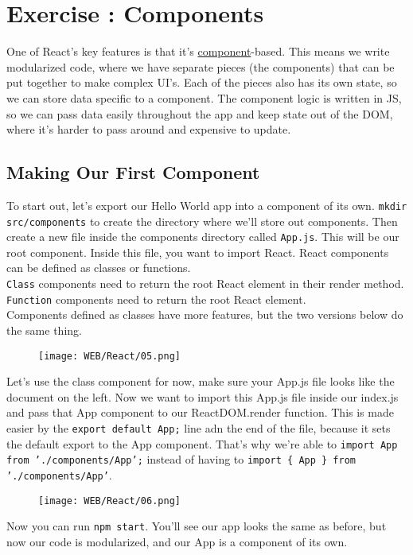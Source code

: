 \documentclass{42-en}
\begin{document}
\chapter{Exercise \exercicenumber: Components}

One of React’s key features is that it’s \href{https://reactjs.org/docs/glossary.html#components}{component}-based. This means we write modularized code, where we have separate pieces (the components) that can be put together to make complex UI’s. Each of the pieces also has its own state, so we can store data specific to a component. The component logic is written in JS, so we can pass data easily throughout the app and keep state out of the DOM, where it’s harder to pass around and expensive to update.

\section{Making Our First Component}
To start out, let’s export our Hello World app into a component of its own. \texttt{mkdir src/components} to create the directory where we’ll store out components. Then create a new file inside the components directory called \texttt{App.js}. This will be our root component. Inside this file, you want to import React. React components can be defined as classes or functions.\\
\texttt{Class} components need to return the root React element in their render method.\\
\texttt{Function} components need to return the root React element.\\
Components defined as classes have more features, but the two versions below do the same thing.
\begin{figure}[H]
    \begin{center}
        \texttt{[image: WEB/React/05.png]}
    \end{center}
\end{figure}
Let’s use the class component for now, make sure your App.js file looks like the document on the left. Now we want to import this App.js file inside our index.js and pass that App component to our ReactDOM.render function. This is made easier by the \texttt{export default App;} line adn the end of the file, because it sets the default export to the App component. That’s why we’re able to \texttt{import App from './components/App';} instead of having to \texttt{import \{ App \} from './components/App'}.
\begin{figure}[H]
    \begin{center}
        \texttt{[image: WEB/React/06.png]}
    \end{center}
\end{figure}
Now you can run \texttt{npm start}. You’ll see our app looks the same as before, but now our code is modularized, and our App is a component of its own.
\end{document}
